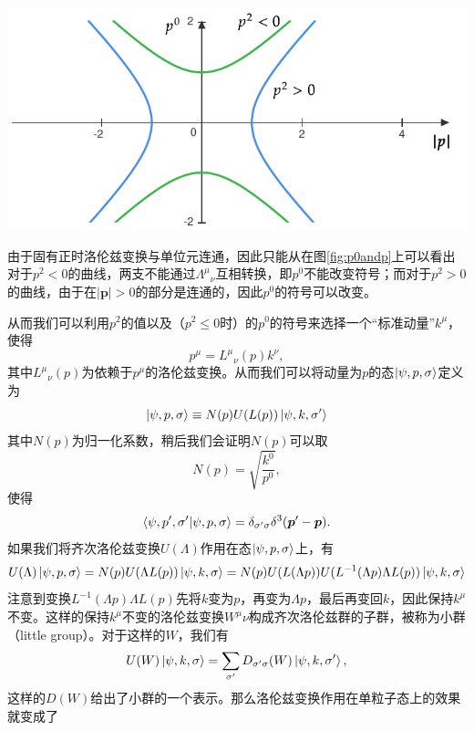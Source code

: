 \begin{center}
	\includegraphics[scale=0.8]{p0andp.pdf}
	\label{fig:p0andp}
\end{center}

由于固有正时洛伦兹变换与单位元连通，因此只能从在图\ref{fig:p0andp}上可以看出对于$ p^{2} < 0$的曲线，两支不能通过$ \Lambda ^{\mu }{}_{\nu }$互相转换，即$ p^{0}$不能改变符号；而对于$ p^{2}  >0$的曲线，由于在$ | \boldsymbol{p}|  >0$的部分是连通的，因此$ p^{0}$的符号可以改变。



从而我们可以利用$ p^{2}$的值以及（$ p^{2} \leq 0$时）的$ p^{0}$的符号来选择一个“标准动量”$ k^{\mu }$，使得
\begin{equation*}
	p^{\mu } =L^{\mu }{}_{\nu }( p) k^{\nu } ,
\end{equation*}
其中$ L^{\mu }{}_{\nu }( p)$为依赖于$ p^{\mu }$的洛伦兹变换。从而我们可以将动量为$ p$的态$ \ket{\psi ,p,\sigma }$定义为
\begin{equation*}
	\ket{\psi ,p,\sigma } \equiv N( p) U( L( p))\ket{\psi ,k,\sigma '}
\end{equation*}
其中$ N( p)$为归一化系数，稍后我们会证明$ N( p)$可以取
\begin{equation*}
	N( p) =\sqrt{\frac{k^{0}}{p^{0}}} ,
\end{equation*}
使得
\begin{equation*}
	\bra{\psi ,p',\sigma '}\ket{\psi ,p,\sigma } =\delta _{\sigma '\sigma } \delta ^{3}(\boldsymbol{p} '-\boldsymbol{p}) .
\end{equation*}
如果我们将齐次洛伦兹变换$ U( \Lambda )$作用在态$ \ket{\psi ,p,\sigma }$上，有
\begin{equation*}
	U( \Lambda )\ket{\psi ,p,\sigma } =N( p) U( \Lambda L( p))\ket{\psi ,k,\sigma } =N( p) U( L( \Lambda p)) U(L^{-1}( \Lambda p) \Lambda L( p) )\ket{\psi ,k,\sigma }
\end{equation*}
注意到变换$ L^{-1}( \Lambda p) \Lambda L( p)$先将$ k$变为$ p$，再变为$ \Lambda p$，最后再变回$ k$，因此保持$ k^{\mu }$不变。这样的保持$ k^{\mu }$不变的洛伦兹变换$ W^{\mu } \nu $构成齐次洛伦兹群的子群，被称为小群（little group）。对于这样的$ W$，我们有
\begin{equation}
	U( W)\ket{\psi ,k,\sigma } =\sum _{\sigma '} D_{\sigma '\sigma }( W)\ket{\psi ,k,\sigma '} ,
	\label{eq:litgrouprep}
\end{equation}
这样的$ D( W)$给出了小群的一个表示。那么洛伦兹变换作用在单粒子态上的效果就变成了

